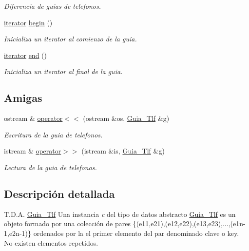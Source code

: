 \begin{DoxyCompactItemize}
\begin{DoxyCompactList}\small\item\em Diferencia de guias de telefonos. \end{DoxyCompactList}\item 
\mbox{\label{classGuia__Tlf_a0a0f50f45b96349e005d7457a0c05574}} 
\hyperlink{classGuia__Tlf_1_1iterator}{iterator} \hyperlink{classGuia__Tlf_a0a0f50f45b96349e005d7457a0c05574}{begin} ()
\begin{DoxyCompactList}\small\item\em Inicializa un iterator al comienzo de la guia. \end{DoxyCompactList}\item 
\mbox{\label{classGuia__Tlf_a91777ba1c5e206259943af1eae5aa305}} 
\hyperlink{classGuia__Tlf_1_1iterator}{iterator} \hyperlink{classGuia__Tlf_a91777ba1c5e206259943af1eae5aa305}{end} ()
\begin{DoxyCompactList}\small\item\em Inicializa un iterator al final de la guia. \end{DoxyCompactList}\end{DoxyCompactItemize}
\subsection*{Amigas}
\begin{DoxyCompactItemize}
\item 
ostream \& \hyperlink{classGuia__Tlf_a73eb02557f3118999710c66aa9ecf309}{operator$<$$<$} (ostream \&os, \hyperlink{classGuia__Tlf}{Guia\+\_\+\+Tlf} \&g)
\begin{DoxyCompactList}\small\item\em Escritura de la guia de telefonos. \end{DoxyCompactList}\item 
istream \& \hyperlink{classGuia__Tlf_ac15a5b0c2eb7d5b1843f11beb492495e}{operator$>$$>$} (istream \&is, \hyperlink{classGuia__Tlf}{Guia\+\_\+\+Tlf} \&g)
\begin{DoxyCompactList}\small\item\em Lectura de la guia de telefonos. \end{DoxyCompactList}\end{DoxyCompactItemize}


\subsection{Descripción detallada}
T.\+D.\+A. \hyperlink{classGuia__Tlf}{Guia\+\_\+\+Tlf} Una instancia {\itshape c} del tipo de datos abstracto {\ttfamily \hyperlink{classGuia__Tlf}{Guia\+\_\+\+Tlf}} es un objeto formado por una colección de pares \{(e11,e21),(e12,e22),(e13,e23),...,(e1n-\/1,e2n-\/1)\} ordenados por la el primer elemento del par denominado clave o key. No existen elementos repetidos. 

